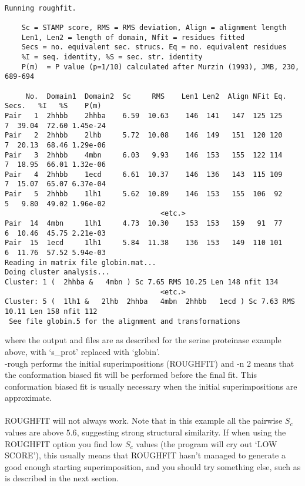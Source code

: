 \begin{scriptsize}\begin{verbatim}

Running roughfit.

    Sc = STAMP score, RMS = RMS deviation, Align = alignment length
    Len1, Len2 = length of domain, Nfit = residues fitted
    Secs = no. equivalent sec. strucs. Eq = no. equivalent residues
    %I = seq. identity, %S = sec. str. identity
    P(m)  = P value (p=1/10) calculated after Murzin (1993), JMB, 230, 689-694

     No.  Domain1  Domain2  Sc     RMS    Len1 Len2  Align NFit Eq. Secs.   %I   %S    P(m)
Pair   1  2hhbb    2hhba    6.59  10.63    146  141   147  125 125    7  39.04  72.60 1.45e-24 
Pair   2  2hhbb    2lhb     5.72  10.08    146  149   151  120 120    7  20.13  68.46 1.29e-06 
Pair   3  2hhbb    4mbn     6.03   9.93    146  153   155  122 114    7  18.95  66.01 1.32e-06 
Pair   4  2hhbb    1ecd     6.61  10.37    146  136   143  115 109    7  15.07  65.07 6.37e-04 
Pair   5  2hhbb    1lh1     5.62  10.89    146  153   155  106  92    5   9.80  49.02 1.96e-02 
                                     <etc.>
Pair  14  4mbn     1lh1     4.73  10.30    153  153   159   91  77    6  10.46  45.75 2.21e-03 
Pair  15  1ecd     1lh1     5.84  11.38    136  153   149  110 101    6  11.76  57.52 5.94e-03 
Reading in matrix file globin.mat...
Doing cluster analysis...
Cluster: 1 (  2hhba &   4mbn ) Sc 7.65 RMS 10.25 Len 148 nfit 134 
                                     <etc.>
Cluster: 5 (  1lh1 &   2lhb  2hhba   4mbn  2hhbb   1ecd ) Sc 7.63 RMS 10.11 Len 158 nfit 112 
 See file globin.5 for the alignment and transformations
\end{verbatim} \end{scriptsize}

where the output and files are as described for the serine proteinase example above,
with `s\_prot' replaced with `globin'.\\

-rough performs the initial superimpositions (ROUGHFIT) and -n 2 means that the conformation 
biased fit will be performed before the final fit.  This conformation biased fit is
usually necessary when the initial superimpositions are approximate.\\
\\
ROUGHFIT will not always work.  Note that in this example all the pairwise
$S_{c}$ values are above $5.6$, suggesting strong structural similarity.  If
when using the ROUGHFIT option you find low $S_{c}$ values (the program will
cry out `LOW SCORE'), this usually means that ROUGHFIT hasn't
managed to generate a good enough starting superimposition, and you should
try something else, such as is described in the next section.


